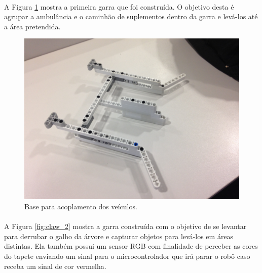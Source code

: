 \documentclass[12pt,a4paper]{article}
\begin{document}
	\paragraph{}
		A Figura \ref{fig:claw_1} mostra a primeira garra que foi construída. O 
		objetivo desta é agrupar a ambulância e o caminhão de suplementos dentro 
		da garra e levá-los até a área pretendida.

	\begin{figure}[H]
		\includegraphics[width=\linewidth]{../Images/claw_1.JPG}
		\caption{Base para acoplamento dos veículos.}
		\label{fig:claw_1}
	\end{figure}

	\paragraph{}
		A Figura \ref{fig:claw_2} mostra a garra construída com o objetivo de se 
		levantar para derrubar o galho da árvore e capturar objetos para 
		levá-los em áreas distintas. Ela também possui um sensor RGB com 
		finalidade de perceber as cores do tapete enviando um sinal para o 
		microcontrolador que irá parar o robô caso receba um sinal de cor 
		vermelha.
\end{document}
